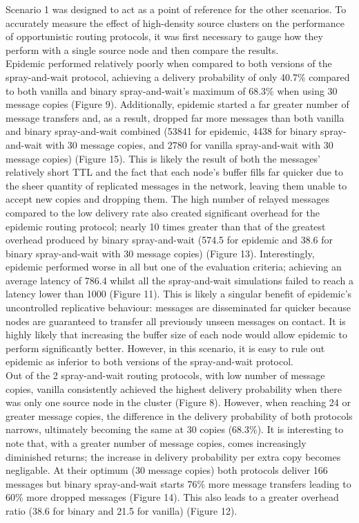 \documentclass{article}
\begin{document}
\newpage

\noindent Scenario 1 was designed to act as a point of reference for the other scenarios. To accurately measure the effect of high-density source clusters on the performance of opportunistic routing protocols, it was first necessary to gauge how they perform with a single source node and then compare the results.\\
\newline Epidemic performed relatively poorly when compared to both versions of the spray-and-wait protocol, achieving a delivery probability of only 40.7\% compared to both vanilla and binary spray-and-wait's maximum of 68.3\% when using 30 message copies (Figure 9). Additionally, epidemic started a far greater number of message transfers and, as a result, dropped far more messages than both vanilla and binary spray-and-wait combined (53841 for epidemic, 4438 for binary spray-and-wait with 30 message copies, and 2780 for vanilla spray-and-wait with 30 message copies) (Figure 15). This is likely the result of both the messages' relatively short TTL and the fact that each node's buffer fills far quicker due to the sheer quantity of replicated messages in the network, leaving them unable to accept new copies and dropping them. The high number of relayed messages compared to the low delivery rate also created significant overhead for the epidemic routing protocol; nearly 10 times greater than that of the greatest overhead produced by binary spray-and-wait (574.5 for epidemic and 38.6 for binary spray-and-wait with 30 message copies) (Figure 13). Interestingly, epidemic performed worse in all but one of the evaluation criteria; achieving an average latency of 786.4 whilst all the spray-and-wait simulations failed to reach a latency lower than 1000 (Figure 11). This is likely a singular benefit of epidemic's uncontrolled replicative behaviour: messages are disseminated far quicker because nodes are guaranteed to transfer all previously unseen messages on contact. It is highly likely that increasing the buffer size of each node would allow epidemic to perform significantly better. However, in this scenario, it is easy to rule out epidemic as inferior to both versions of the spray-and-wait protocol.\\
\newline Out of the 2 spray-and-wait routing protocols, with low number of message copies, vanilla consistently achieved the highest delivery probability when there was only one source node in the cluster (Figure 8). However, when reaching 24 or greater message copies, the difference in the delivery probability of both protocols narrows, ultimately becoming the same at 30 copies (68.3\%). It is interesting to note that, with a greater number of message copies, comes increasingly diminished returns; the increase in delivery probability per extra copy becomes negligable. At their optimum (30 message copies) both protocols deliver 166 messages but binary spray-and-wait starts 76\% more message transfers leading to 60\% more dropped messages (Figure 14). This also leads to a greater overhead ratio (38.6 for binary and 21.5 for vanilla) (Figure 12).\\
\end{document}
